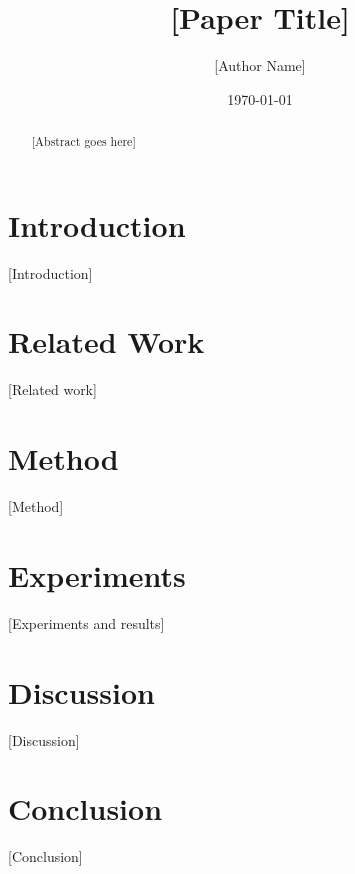 \documentclass[11pt,a4paper]{article}
\title{[Paper Title]}
\author{[Author Name]}
\date{\today}
\begin{document}
\maketitle

\begin{abstract}
[Abstract goes here]
\end{abstract}

\section{Introduction}

[Introduction]

\section{Related Work}

[Related work]

\section{Method}

[Method]

\section{Experiments}

[Experiments and results]

\section{Discussion}

[Discussion]

\section{Conclusion}

[Conclusion]



\end{document}
